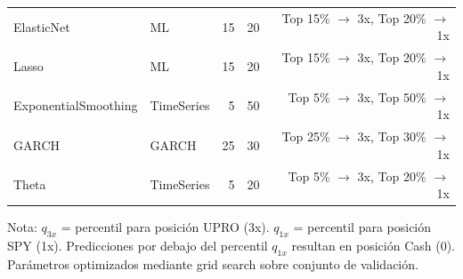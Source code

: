 \begin{table}[htbp]
\begin{tabular}{@{}llrrr@{}}
ElasticNet & ML & 15 & 20 & Top 15\% $\rightarrow$ 3x, Top 20\% $\rightarrow$ 1x \\
Lasso & ML & 15 & 20 & Top 15\% $\rightarrow$ 3x, Top 20\% $\rightarrow$ 1x \\
ExponentialSmoothing & TimeSeries & 5 & 50 & Top 5\% $\rightarrow$ 3x, Top 50\% $\rightarrow$ 1x \\
GARCH & GARCH & 25 & 30 & Top 25\% $\rightarrow$ 3x, Top 30\% $\rightarrow$ 1x \\
Theta & TimeSeries & 5 & 20 & Top 5\% $\rightarrow$ 3x, Top 20\% $\rightarrow$ 1x \\
\bottomrule
\end{tabular}
\begin{tablenotes}
\small
\item Nota: $q_{3x}$ = percentil para posici\'on UPRO (3x). $q_{1x}$ = percentil para posici\'on SPY (1x). Predicciones por debajo del percentil $q_{1x}$ resultan en posici\'on Cash (0). Par\'ametros optimizados mediante grid search sobre conjunto de validaci\'on.
\end{tablenotes}
\end{table}
